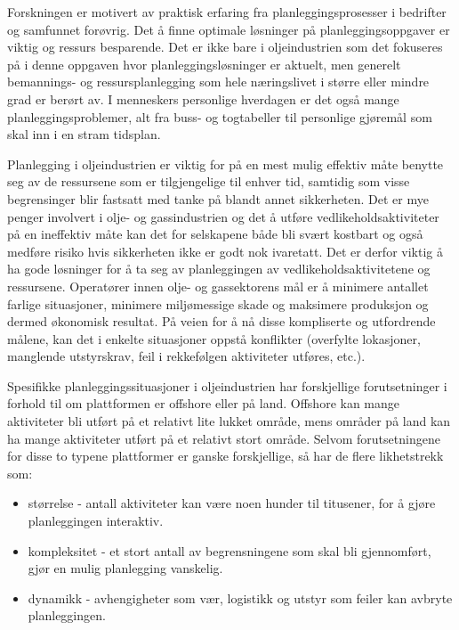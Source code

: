 Forskningen er motivert av praktisk erfaring fra planleggingsprosesser i bedrifter og samfunnet forøvrig. Det å finne optimale løsninger på planleggingsoppgaver er viktig og ressurs besparende. Det er ikke bare i oljeindustrien som det fokuseres på i denne oppgaven hvor planleggingsløsninger er aktuelt, men generelt bemannings- og ressursplanlegging som hele næringslivet i større eller mindre grad er berørt av. I menneskers personlige hverdagen er det også mange planleggingsproblemer, alt fra buss- og togtabeller til personlige gjøremål som skal inn i en stram tidsplan.

Planlegging i oljeindustrien er viktig for på en mest mulig effektiv måte benytte seg av de ressursene som er tilgjengelige til enhver tid, samtidig som visse begrensinger blir fastsatt med tanke på blandt annet sikkerheten. Det er mye penger involvert i olje- og gassindustrien og det å utføre vedlikeholdsaktiviteter på en ineffektiv måte kan det for selskapene både bli svært kostbart og også medføre risiko hvis sikkerheten ikke er godt nok ivaretatt. Det er derfor viktig å ha gode løsninger for å ta seg av planleggingen av vedlikeholdsaktivitetene og ressursene. Operatører innen olje- og gassektorens mål er å minimere antallet farlige situasjoner, minimere miljømessige skade og maksimere produksjon og dermed økonomisk resultat. På veien for å nå disse kompliserte og utfordrende målene, kan det i enkelte situasjoner oppstå konflikter (overfylte lokasjoner, manglende utstyrskrav, feil i rekkefølgen aktiviteter utføres, etc.).

Spesifikke planleggingssituasjoner i oljeindustrien har forskjellige forutsetninger i forhold til om plattformen er offshore eller på land. Offshore kan mange aktiviteter bli utført på et relativt lite lukket område, mens områder på land kan ha mange aktiviteter utført på et relativt stort område. Selvom forutsetningene for disse to typene plattformer er ganske forskjellige, så har de flere likhetstrekk som:
\begin{itemize}
\item størrelse - antall aktiviteter kan være noen hunder til titusener, for å gjøre planleggingen interaktiv.
\item kompleksitet - et stort antall av begrensningene som skal bli gjennomført, gjør en mulig planlegging vanskelig.
\item dynamikk - avhengigheter som vær, logistikk og utstyr som feiler kan avbryte planleggingen.
\end{itemize}

